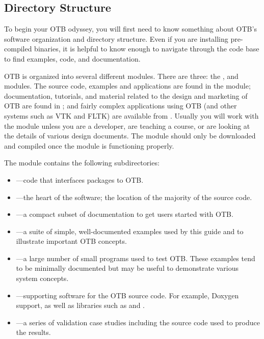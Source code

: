 \subsection{Directory Structure}
\label{sec:DirectoryStructure}

To begin your OTB odyssey, you will first need to know something about OTB's
software organization and directory structure. Even if you are installing
pre-compiled binaries, it is helpful to know enough to navigate through the
code base to find examples, code, and documentation.

OTB is organized into several different modules. There are three:
the ,  and 
modules. The source code, examples and applications are found in the
 module; documentation, tutorials, and material related to the
design and marketing of OTB are found in ; and fairly
complex applications using OTB (and other systems such as VTK and FLTK)
are available from . Usually you will work with the
 module unless you are a developer, are teaching a course, or
are looking at the details of various design documents. The
 module should only be downloaded and
compiled once
the  module is functioning properly.

The  module contains the following subdirectories:
\begin{itemize}
        \item {}---code that interfaces packages
        to OTB.
        \item {}---the heart of the software; the location
        of the majority of the source code.
        \item {}---a compact subset of documentation
        to get users started with OTB.
        \item {}---a suite of simple, well-documented
        examples used by this guide and to illustrate important
        OTB concepts.
        \item {}---a large number of small programs used
        to test OTB. These examples tend to be minimally documented but may
        be useful to demonstrate various system concepts. 
        \item {}---supporting software for the OTB
        source code. For example, Doxygen support, as well as 
        libraries such as  and .
        \item {}---a series of validation case studies
        including the source code used to produce the results.
\end{itemize}


